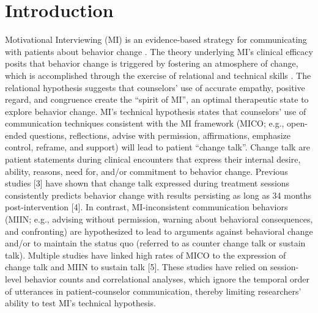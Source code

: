 \section{Introduction}
\label{sec:intro}
Motivational Interviewing (MI) is an evidence-based strategy for communicating with patients about behavior change \citep{miller2013motivational}. The theory underlying MI’s clinical efficacy posits that behavior change is triggered by fostering an atmosphere of change, which is accomplished through the exercise of relational and technical skills \citep{miller2013motivational}. The relational hypothesis suggests that counselors’ use of accurate empathy, positive regard, and congruence create the “spirit of MI”, an optimal therapeutic state to explore behavior change. MI’s technical hypothesis \citep{miller2009toward} states that counselors’ use of communication techniques consistent with the MI framework (MICO; e.g., open-ended questions, reflections, advise with permission, affirmations, emphasize control, reframe, and support) will lead to patient “change talk”. Change talk are patient statements during clinical encounters that express their internal desire, ability, reasons, need for, and/or commitment to behavior change. Previous studies [3] have shown that change talk expressed during treatment sessions consistently predicts behavior change with results persisting as long as 34 months post-intervention [4]. In contrast, MI-inconsistent communication behaviors (MIIN; e.g., advising without permission, warning about behavioral consequences, and confronting) are hypothesized to lead to arguments against behavioral change and/or to maintain the status quo (referred to as counter change talk or sustain talk). Multiple studies have linked high rates of MICO to the expression of change talk and MIIN to sustain talk [5]. These studies have relied on session-level behavior counts and correlational analyses, which ignore the temporal order of utterances in patient-counselor communication, thereby limiting researchers’ ability to test MI’s technical hypothesis. 

